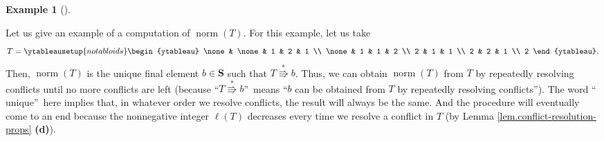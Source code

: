 \documentclass[numbers=enddot,12pt,final,onecolumn,notitlepage]{scrartcl}%
\theoremstyle{definition}
\newtheorem{exmp}[theo]{Example}
\newenvironment{example}[1][]
{\begin{exmp}[#1]\begin{leftbar}}
{\end{leftbar}\end{exmp}}
\newenvironment{vershort}{}{}
\begin{document}
\begin{vershort}
\begin{example}
Let us give an example of a computation of $\operatorname*{norm}\left(
T\right)  $. For this example, let us take%
\[
T=%
\ytableausetup{notabloids}
\begin{ytableau}
\none& \none& 1 & 2 & 1 \\
\none& 1 & 1 & 2 \\
2 & 1 & 1 \\
2 & 2 & 1 \\
2
\end{ytableau}%
.
\]
Then, $\operatorname*{norm}\left(  T\right)  $ is the unique final element
$b\in\mathbf{S}$ such that $T\overset{\ast}{\Rrightarrow}b$. Thus, we can
obtain $\operatorname*{norm}\left(  T\right)  $ from $T$ by repeatedly
resolving conflicts until no more conflicts are left (because
\textquotedblleft$T\overset{\ast}{\Rrightarrow}b$\textquotedblright\ means
\textquotedblleft$b$ can be obtained from $T$ by repeatedly resolving
conflicts\textquotedblright). The word \textquotedblleft
unique\textquotedblright\ here implies that, in whatever order we resolve
conflicts, the result will always be the same. And the procedure will
eventually come to an end because the nonnegative integer $\ell\left(
T\right)  $ decreases every time we resolve a conflict in $T$ (by Lemma
\ref{lem.conflict-resolution-props} \textbf{(d)}).


\end{example}
\end{vershort}
\end{document}
